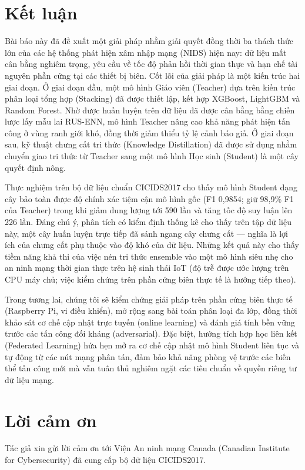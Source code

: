\section{Kết luận}
Bài báo này đã đề xuất một giải pháp nhằm giải quyết đồng thời ba thách thức lớn của các hệ thống phát hiện xâm nhập mạng (NIDS) hiện nay: dữ liệu mất cân bằng nghiêm trọng, yêu cầu về tốc độ phản hồi thời gian thực và hạn chế tài nguyên phần cứng tại các thiết bị biên. Cốt lõi của giải pháp là một kiến trúc hai giai đoạn. Ở giai đoạn đầu, một mô hình Giáo viên (Teacher) dựa trên kiến trúc phân loại tổng hợp (Stacking) đã được thiết lập, kết hợp XGBoost, LightGBM và Random Forest. Nhờ được huấn luyện trên dữ liệu đã được cân bằng bằng chiến lược lấy mẫu lai RUS-ENN, mô hình Teacher nâng cao khả năng phát hiện tấn công ở vùng ranh giới khó, đồng thời giảm thiểu tỷ lệ cảnh báo giả. Ở giai đoạn sau, kỹ thuật chưng cất tri thức (Knowledge Distillation) đã được sử dụng nhằm chuyển giao tri thức từ Teacher sang một mô hình Học sinh (Student) là một cây quyết định nông.

Thực nghiệm trên bộ dữ liệu chuẩn CICIDS2017 cho thấy mô hình Student dạng cây bảo toàn được độ chính xác tiệm cận mô hình gốc (F1 0,9854; giữ 98,9\% F1 của Teacher) trong khi giảm dung lượng tới 590 lần và tăng tốc độ suy luận lên 226 lần. Đáng chú ý, phân tích có kiểm định thống kê cho thấy trên tập dữ liệu này, một cây huấn luyện trực tiếp đã sánh ngang cây chưng cất --- nghĩa là lợi ích của chưng cất phụ thuộc vào độ khó của dữ liệu. Những kết quả này cho thấy tiềm năng khả thi của việc nén tri thức ensemble vào một mô hình siêu nhẹ cho an ninh mạng thời gian thực trên hệ sinh thái IoT (độ trễ được ước lượng trên CPU máy chủ; việc kiểm chứng trên phần cứng biên thực tế là hướng tiếp theo).

Trong tương lai, chúng tôi sẽ kiểm chứng giải pháp trên phần cứng biên thực tế (Raspberry Pi, vi điều khiển), mở rộng sang bài toán phân loại đa lớp, đồng thời khảo sát cơ chế cập nhật trực tuyến (online learning) và đánh giá tính bền vững trước các tấn công đối kháng (adversarial). Đặc biệt, hướng tích hợp học liên kết (Federated Learning) hứa hẹn mở ra cơ chế cập nhật mô hình Student liên tục và tự động từ các nút mạng phân tán, đảm bảo khả năng phòng vệ trước các biến thể tấn công mới mà vẫn tuân thủ nghiêm ngặt các tiêu chuẩn về quyền riêng tư dữ liệu mạng.

\section*{Lời cảm ơn}
Tác giả xin gửi lời cảm ơn tới Viện An ninh mạng Canada (Canadian Institute for Cybersecurity) đã cung cấp bộ dữ liệu CICIDS2017.
